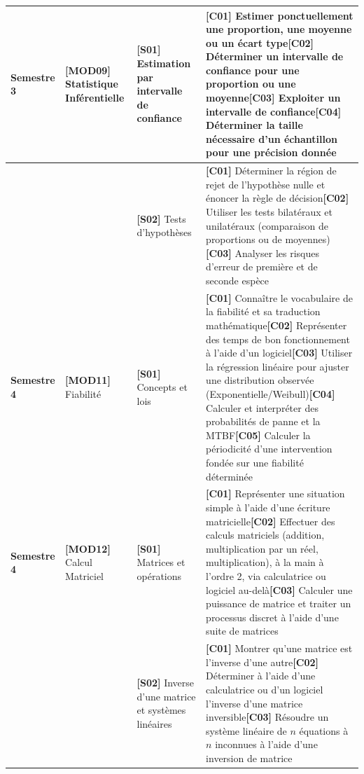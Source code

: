 \documentclass[a4paper,10pt,landscape]{article}
\begin{document}
\begin{longtable}{>{\raggedright\arraybackslash}p{2.2cm} >{\raggedright\arraybackslash}p{3cm} >{\raggedright\arraybackslash}p{3.5cm} >{\raggedright\arraybackslash}p{13.2cm}}
\midrule
\textbf{Semestre 3} & \textbf{[MOD09]} Statistique Inférentielle & \textbf{[S01]} Estimation par intervalle de confiance & \textbf{[C01]} Estimer ponctuellement une proportion, une moyenne ou un écart type\newline \textbf{[C02]} Déterminer un intervalle de confiance pour une proportion ou une moyenne\newline \textbf{[C03]} Exploiter un intervalle de confiance\newline \textbf{[C04]} Déterminer la taille nécessaire d'un échantillon pour une précision donnée \\
\cmidrule(l){3-4}
 &  & \textbf{[S02]} Tests d'hypothèses & \textbf{[C01]} Déterminer la région de rejet de l'hypothèse nulle et énoncer la règle de décision\newline \textbf{[C02]} Utiliser les tests bilatéraux et unilatéraux (comparaison de proportions ou de moyennes)\newline \textbf{[C03]} Analyser les risques d'erreur de première et de seconde espèce \\
\midrule
\textbf{Semestre 4} & \textbf{[MOD11]} Fiabilité & \textbf{[S01]} Concepts et lois & \textbf{[C01]} Connaître le vocabulaire de la fiabilité et sa traduction mathématique\newline \textbf{[C02]} Représenter des temps de bon fonctionnement à l'aide d'un logiciel\newline \textbf{[C03]} Utiliser la régression linéaire pour ajuster une distribution observée (Exponentielle/Weibull)\newline \textbf{[C04]} Calculer et interpréter des probabilités de panne et la MTBF\newline \textbf{[C05]} Calculer la périodicité d'une intervention fondée sur une fiabilité déterminée \\
\midrule
\textbf{Semestre 4} & \textbf{[MOD12]} Calcul Matriciel & \textbf{[S01]} Matrices et opérations & \textbf{[C01]} Représenter une situation simple à l'aide d'une écriture matricielle\newline \textbf{[C02]} Effectuer des calculs matriciels (addition, multiplication par un réel, multiplication), à la main à l'ordre 2, via calculatrice ou logiciel au-delà\newline \textbf{[C03]} Calculer une puissance de matrice et traiter un processus discret à l'aide d'une suite de matrices \\
\cmidrule(l){3-4}
 &  & \textbf{[S02]} Inverse d'une matrice et systèmes linéaires & \textbf{[C01]} Montrer qu'une matrice est l'inverse d'une autre\newline \textbf{[C02]} Déterminer à l'aide d'une calculatrice ou d'un logiciel l'inverse d'une matrice inversible\newline \textbf{[C03]} Résoudre un système linéaire de $n$ équations à $n$ inconnues à l'aide d'une inversion de matrice \\

\end{longtable}
\end{document}
